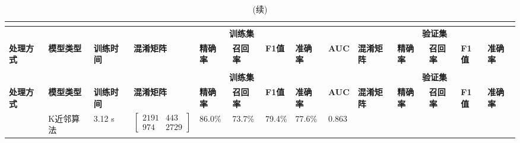 \begin{landscape}
      \begin{longtable}{m{1.5cm}<{\centering}m{1.5cm}<{\centering}m{1.5cm}<{\centering}m{2cm}<{\centering}m{1cm}<{\centering}m{1cm}<{\centering}m{1cm}<{\centering}m{1cm}<{\centering}m{1cm}<{\centering}m{2cm}<{\centering}m{1cm}<{\centering}m{1cm}<{\centering}m{1cm}<{\centering}m{1cm}<{\centering}}
            \caption{几种机器学习模型在被试人员分层抽样的数据集上的表现}\\
            \label{tab:model_screen4}\\
            \toprule
            &     &  & \multicolumn{6}{c}{\textbf{训练集}} & \multicolumn{5}{c}{\textbf{验证集}}                                                                                                                                                                                                      \\
            \multirow{-2}{*}{\textbf{处理方式}}&\multirow{-2}{*}{\textbf{模型类型}} & \multirow{-2}{*}{\textbf{训练时间}} & \textbf{混淆矩阵} &  \textbf{精确率} &  \textbf{召回率} &  \textbf{F1值} &  \textbf{准确率} &  \textbf{AUC} &  \textbf{混淆矩阵} &  \textbf{精确率} &  \textbf{召回率} &  \textbf{F1值} &  \textbf{准确率}    \\
            \midrule
            \endfirsthead
            \caption[]{(续)}\\
            \midrule
            &     &  & \multicolumn{6}{c}{\textbf{训练集}} & \multicolumn{5}{c}{\textbf{验证集}}                                                                                                                                                                                                      \\
            \multirow{-2}{*}{\textbf{处理方式}}&\multirow{-2}{*}{\textbf{模型类型}} & \multirow{-2}{*}{\textbf{训练时间}} & \textbf{混淆矩阵} &  \textbf{精确率} &  \textbf{召回率} &  \textbf{F1值} &  \textbf{准确率} &  \textbf{AUC} &  \textbf{混淆矩阵} &  \textbf{精确率} &  \textbf{召回率} &  \textbf{F1值} &  \textbf{准确率}    \\
            \midrule
            \endhead 
            \midrule
            \endfoot
            \bottomrule
            \endlastfoot
            &     K近邻算法      &   3.12 s  &     $\left[ \begin{array}{cc} 2191 & 443 \\ 974 & 2729 \end{array} \right]$ & 86.0\% & 73.7\% &79.4\% & 77.6\% & 0.863 &

\end{longtable}
\end{landscape}
